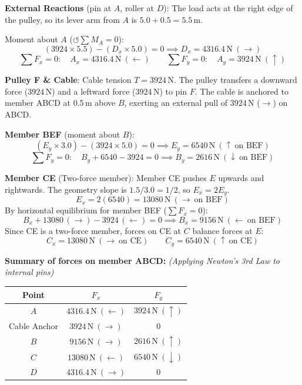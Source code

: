 \documentclass[12pt,a3paper]{article}
\begin{document}
\begin{enumerate}
\begin{tcolorbox}[enhanced,breakable,ansbox,colback=cE!4,colframe=cE,
  boxrule=0.8pt,arc=5pt,
  title={\textbf{Corrected Solution}},fonttitle=\bfseries\color{white},colbacktitle=cE]
\medskip
\textbf{External Reactions} (pin at $A$, roller at $D$):
The load acts at the right edge of the pulley, so its lever arm from $A$ is $5.0 + 0.5 = 5.5$\,m.

Moment about $A$ ($\circlearrowleft\sum M_A = 0$):
\[
  (3924\times 5.5) - (D_x\times 5.0) = 0
  \implies \boxed{D_x = 4316.4\,\text{N}\ (\rightarrow)}
\]
\[
  \sum F_x = 0\colon\quad \boxed{A_x = 4316.4\,\text{N}\ (\leftarrow)}
  \qquad
  \sum F_y = 0\colon\quad \boxed{A_y = 3924\,\text{N}\ (\uparrow)}
\]

\medskip
\textbf{Pulley F \& Cable}:
Cable tension $T = 3924$\,N. The pulley transfers a downward force ($3924$\,N) and a leftward force ($3924$\,N) to pin $F$. 
The cable is anchored to member ABCD at $0.5$\,m above $B$, exerting an external pull of $3924$\,N ($\rightarrow$) on ABCD.

\medskip
\textbf{Member BEF} (moment about $B$):
\[
  (E_y\times 3.0) - (3924\times 5.0) = 0
  \implies \boxed{E_y = 6540\,\text{N}\ (\uparrow\ \text{on BEF})}
\]
\[
  \sum F_y = 0\colon\quad B_y + 6540 - 3924 = 0
  \implies \boxed{B_y = 2616\,\text{N}\ (\downarrow\ \text{on BEF})}
\]

\medskip
\textbf{Member CE} (Two-force member):
Member CE pushes $E$ upwards and rightwards. The geometry slope is $1.5/3.0 = 1/2$, so $E_x = 2E_y$.
\[
  E_x = 2(6540) = 13080\,\text{N}\ (\rightarrow\ \text{on BEF})
\]
By horizontal equilibrium for member BEF ($\sum F_x = 0$):
\[
  B_x + 13080\,(\rightarrow) - 3924\,(\leftarrow) = 0 
  \implies \boxed{B_x = 9156\,\text{N}\ (\leftarrow\ \text{on BEF})}
\]
Since CE is a two-force member, forces on CE at $C$ balance forces at $E$:
\[
  \boxed{C_x = 13080\,\text{N}\ (\rightarrow\ \text{on CE})}
  \qquad
  \boxed{C_y = 6540\,\text{N}\ (\uparrow\ \text{on CE})}
\]

\medskip
\textbf{Summary of forces on member ABCD:}
\textit{(Applying Newton's 3rd Law to internal pins)}
\begin{center}
\begin{tabular}{ccc}
\toprule
\textbf{Point} & $F_x$ & $F_y$ \\
\midrule
$A$ & $4316.4\,\text{N}\ (\leftarrow)$ & $3924\,\text{N}\ (\uparrow)$ \\
Cable Anchor & $3924\,\text{N}\ (\rightarrow)$ & $0$ \\
$B$ & $9156\,\text{N}\ (\rightarrow)$ & $2616\,\text{N}\ (\uparrow)$ \\
$C$ & $13080\,\text{N}\ (\leftarrow)$ & $6540\,\text{N}\ (\downarrow)$ \\
$D$ & $4316.4\,\text{N}\ (\rightarrow)$ & $0$ \\
\bottomrule
\end{tabular}
\end{center}


\end{tcolorbox}
\end{enumerate}
\end{document}
